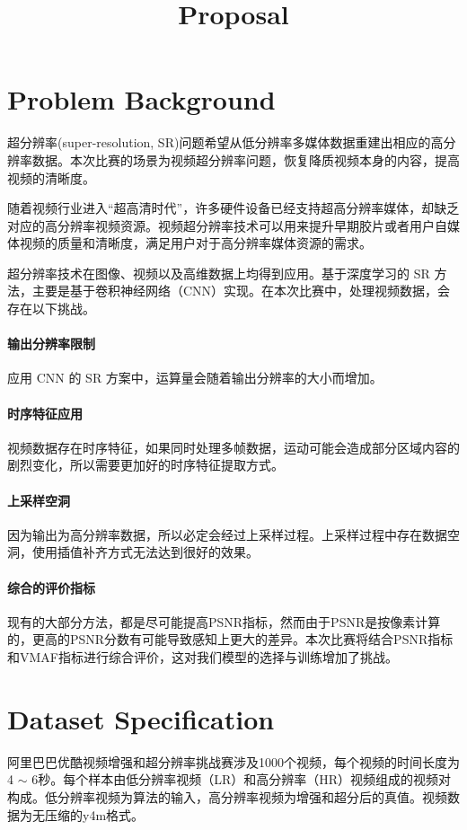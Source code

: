 \documentclass{article}
\title{Proposal}
\author{%
}
\begin{document}

\maketitle

\section{Problem Background}
超分辨率(super-resolution, SR)问题希望从低分辨率多媒体数据重建出相应的高分辨率数据。本次比赛的场景为视频超分辨率问题，恢复降质视频本身的内容，提高视频的清晰度。


随着视频行业进入“超高清时代”，许多硬件设备已经支持超高分辨率媒体，却缺乏对应的高分辨率视频资源。视频超分辨率技术可以用来提升早期胶片或者用户自媒体视频的质量和清晰度，满足用户对于高分辨率媒体资源的需求。


超分辨率技术在图像、视频以及高维数据上均得到应用。基于深度学习的 SR 方法，主要是基于卷积神经网络（CNN）实现。在本次比赛中，处理视频数据，会存在以下挑战。


\paragraph{输出分辨率限制} 应用 CNN 的 SR 方案中，运算量会随着输出分辨率的大小而增加。
\paragraph{时序特征应用} 视频数据存在时序特征，如果同时处理多帧数据，运动可能会造成部分区域内容的剧烈变化，所以需要更加好的时序特征提取方式。
\paragraph{上采样空洞} 因为输出为高分辨率数据，所以必定会经过上采样过程。上采样过程中存在数据空洞，使用插值补齐方式无法达到很好的效果。
\paragraph{综合的评价指标} 现有的大部分方法，都是尽可能提高PSNR指标，然而由于PSNR是按像素计算的，更高的PSNR分数有可能导致感知上更大的差异。本次比赛将结合PSNR指标和VMAF指标进行综合评价，这对我们模型的选择与训练增加了挑战。

\section{Dataset Specification}
阿里巴巴优酷视频增强和超分辨率挑战赛\cite{competition}涉及1000个视频，每个视频的时间长度为4 $\sim$ 6秒。每个样本由低分辨率视频（LR）和高分辨率（HR）视频组成的视频对构成。低分辨率视频为算法的输入，高分辨率视频为增强和超分后的真值。视频数据为无压缩的y4m格式。
\end{document}
